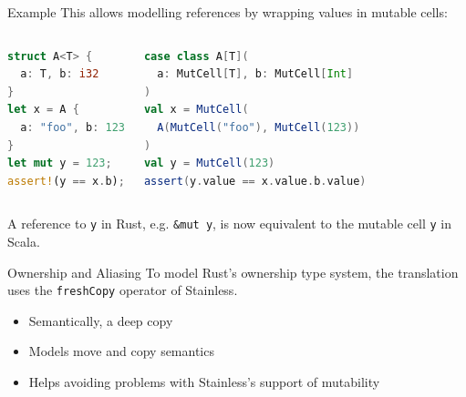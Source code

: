 \begin{frame}[fragile]{Example}
This allows modelling references by wrapping values in mutable cells:

\begin{columns}
\begin{lstlisting}[language=Rust]
struct A<T> {
  a: T, b: i32
}
let x = A {
  a: "foo", b: 123
}
let mut y = 123;
assert!(y == x.b);
\end{lstlisting}
\begin{lstlisting}[language=Scala]
case class A[T](
  a: MutCell[T], b: MutCell[Int]
)
val x = MutCell(
  A(MutCell("foo"), MutCell(123))
)
val y = MutCell(123)
assert(y.value == x.value.b.value)
\end{lstlisting}
\end{columns}

A reference to \lstinline!y! in Rust, e.g. \lstinline!&mut y!, is now equivalent
to the mutable cell \lstinline!y! in Scala.
\end{frame}



\begin{frame}{Ownership and Aliasing}
To model Rust's ownership type system, the translation uses the
\lstinline!freshCopy! operator of Stainless.

\begin{itemize}
\item Semantically, a deep copy
\item Models move and copy semantics
\item Helps avoiding problems with Stainless's support of mutability
\end{itemize}
\end{frame}

